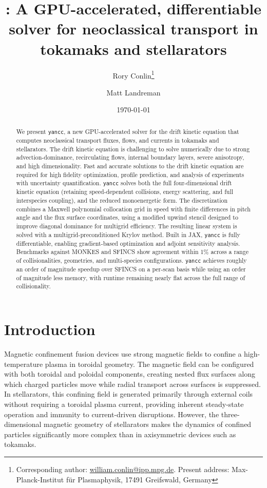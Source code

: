 \documentclass[11pt]{article}
\title{\yancc: A GPU-accelerated, differentiable solver for neoclassical transport in
tokamaks and stellarators}
\author[1]{Rory Conlin\thanks{Corresponding author:
\href{mailto:william.conlin@ipp.mpg.de}{william.conlin@ipp.mpg.de}. Present address:
Max-Planck-Institut f\"ur Plasmaphysik, 17491 Greifswald, Germany}}
\author[1]{Matt Landreman}
\affil[1]{Institute for Research in Electronics and Applied Physics,
University of Maryland, College Park, MD 20742, USA}
\date{\today}
\newcommand{\yancc}{\texttt{yancc}}
\begin{document}
\maketitle

\begin{abstract}
We present \yancc, a new GPU-accelerated solver for the drift kinetic
equation that computes neoclassical transport fluxes, flows, and currents in
tokamaks and stellarators. The drift kinetic equation is challenging to solve
numerically due to strong advection-dominance, recirculating flows, internal
boundary layers, severe anisotropy, and high dimensionality. Fast and accurate
solutions to the drift kinetic equation are required for high fidelity optimization,
profile prediction, and analysis of experiments with uncertainty quantification.
\yancc{} solves both the full four-dimensional drift kinetic equation (retaining
speed-dependent collisions, energy scattering, and full interspecies
coupling), and the reduced monoenergetic form. The discretization combines a
Maxwell polynomial collocation grid in speed with finite differences in pitch angle
and the flux surface coordinates, using a modified upwind stencil designed to
improve diagonal dominance for multigrid efficiency. The resulting linear
system is solved with a multigrid-preconditioned Krylov method. Built in JAX,
\yancc{} is fully differentiable, enabling gradient-based optimization and
adjoint sensitivity analysis. Benchmarks against MONKES and SFINCS show
agreement within 1\% across a range of collisionalities, geometries, and
multi-species configurations. \yancc{} achieves roughly an order of magnitude
speedup over SFINCS on a per-scan basis while using an order of magnitude less
memory, with runtime remaining nearly flat across the full range of
collisionality.
\end{abstract}

\section{Introduction}
\label{sec:introduction}

Magnetic confinement fusion devices use strong magnetic fields to confine a
high-temperature plasma in toroidal geometry. The magnetic field can be
configured with both toroidal and poloidal components, creating nested flux
surfaces along which charged particles move while radial transport across
surfaces is suppressed. In stellarators, this confining field is generated primarily
through external coils without requiring a toroidal plasma current, providing
inherent steady-state operation and immunity to current-driven disruptions.
However, the three-dimensional magnetic geometry of stellarators makes the
dynamics of confined particles significantly more complex than in axisymmetric
devices such as tokamaks.
\end{document}
